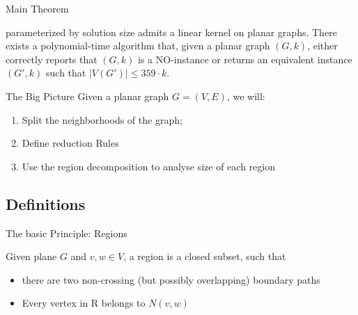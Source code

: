 \begin{frame}[c]{Main Theorem}
\begin{tcolorbox}[colback=TUMBlueLighter,title=The Main Theorem]
    \sdom parameterized by solution size admits a linear kernel on planar graphs.
    There exists a polynomial-time algorithm that, given a planar graph $(G, k)$, either correctly reports that $(G, k)$ is a NO-instance or returns an equivalent instance $(G', k)$ such that $|V(G')| \leq 359 \cdot k$.
\end{tcolorbox}
\end{frame}

\begin{frame}[c]{The Big Picture}
    Given a planar graph $G = (V ,E)$, we will:

    \begin{enumerate}
        \item Split the neighborhoods of the graph;
        \item Define reduction Rules
        \item Use the region decomposition to analyse size of each region
    \end{enumerate}
\end{frame}

\subsection{Definitions}
\begin{frame}[c]{The basic Principle: Regions}

    \begin{tcolorbox}[colback=TUMBlueLighter,title=Region (Simplified)]
        Given plane $G$ and $v,w \in V$, a region is a closed subset, such that
        \begin{itemize}
            \item there are two non-crossing (but possibly overlapping) boundary paths
            \item Every vertex in R belongs to $N(v,w)$
        \end{itemize}
    \end{tcolorbox}
        \begin{figure}[!ht]
        \end{figure}
\end{frame}

